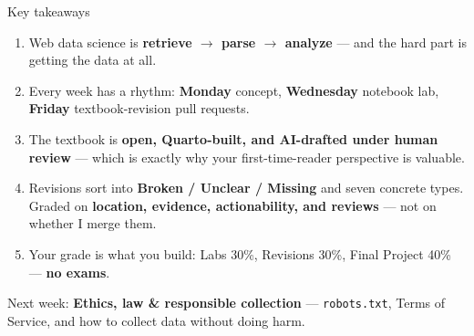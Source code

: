 \documentclass[9pt,aspectratio=169]{beamer}
\begin{document}
\begin{frame}{Key takeaways}
    \begin{enumerate}
        \item Web data science is \textbf{retrieve $\rightarrow$ parse $\rightarrow$ analyze} --- and the hard part is getting the data at all.
        \item Every week has a rhythm: \textbf{Monday} concept, \textbf{Wednesday} notebook lab, \textbf{Friday} textbook-revision pull requests.
        \item The textbook is \textbf{open, Quarto-built, and AI-drafted under human review} --- which is exactly why your first-time-reader perspective is valuable.
        \item Revisions sort into \textbf{Broken / Unclear / Missing} and seven concrete types. Graded on \textbf{location, evidence, actionability, and reviews} --- not on whether I merge them.
        \item Your grade is what you build: Labs 30\%, Revisions 30\%, Final Project 40\% --- \textbf{no exams}.
    \end{enumerate}
    \vspace{0.5em}
    \centering\small Next week: \textbf{Ethics, law \& responsible collection} --- \texttt{robots.txt}, Terms of Service, and how to collect data without doing harm.
\end{frame}
\end{document}
